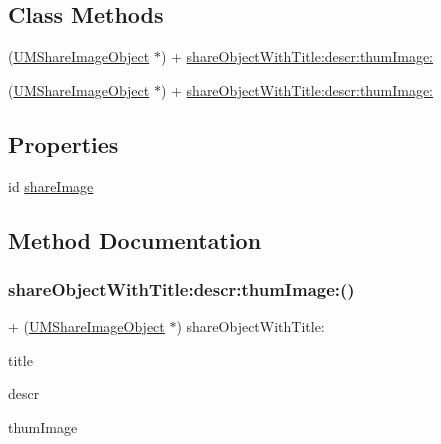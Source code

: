 \subsection*{Class Methods}
\begin{DoxyCompactItemize}
\item 
(\mbox{\hyperlink{interface_u_m_share_image_object}{U\+M\+Share\+Image\+Object}} $\ast$) + \mbox{\hyperlink{interface_u_m_share_image_object_a8940566176ff015a4fc7a1397e5e241d}{share\+Object\+With\+Title\+:descr\+:thum\+Image\+:}}
\item 
(\mbox{\hyperlink{interface_u_m_share_image_object}{U\+M\+Share\+Image\+Object}} $\ast$) + \mbox{\hyperlink{interface_u_m_share_image_object_a8940566176ff015a4fc7a1397e5e241d}{share\+Object\+With\+Title\+:descr\+:thum\+Image\+:}}
\end{DoxyCompactItemize}
\subsection*{Properties}
\begin{DoxyCompactItemize}
\item 
id \mbox{\hyperlink{interface_u_m_share_image_object_af4e4f090ffb221e028897213715c22ff}{share\+Image}}
\end{DoxyCompactItemize}


\subsection{Method Documentation}
\mbox{\label{interface_u_m_share_image_object_a8940566176ff015a4fc7a1397e5e241d}} 
\subsubsection{\texorpdfstring{share\+Object\+With\+Title\+:descr\+:thum\+Image\+:()}{shareObjectWithTitle:descr:thumImage:()}\hspace{0.1cm}{\footnotesize\ttfamily [1/2]}}
{\footnotesize\ttfamily + (\mbox{\hyperlink{interface_u_m_share_image_object}{U\+M\+Share\+Image\+Object}} $\ast$) share\+Object\+With\+Title\+: \begin{DoxyParamCaption}\item[{(N\+S\+String $\ast$)}]{title }\item[{descr:(N\+S\+String $\ast$)}]{descr }\item[{thumImage:(id)}]{thum\+Image }\end{DoxyParamCaption}}


